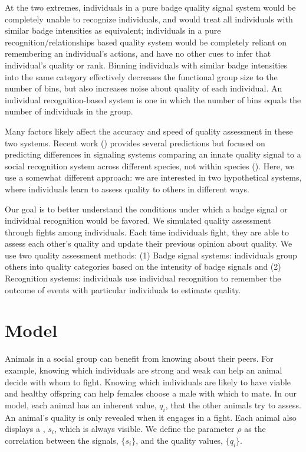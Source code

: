 At the two extremes, individuals in a pure badge quality signal system would be completely unable to recognize individuals, and would treat all individuals with similar badge intensities as equivalent; individuals in a pure recognition/relationships based quality system would be completely reliant on remembering an individual's actions, and have no other cues to infer that individual's quality or rank. Binning individuals with similar badge intensities into the same category effectively decreases the functional group size to the number of bins, but also increases noise about quality of each individual. An individual recognition-based system is one in which the number of bins equals the number of individuals in the group.  

Many factors likely affect the accuracy and speed of quality assessment in these two systems. Recent work (\cite{sheehan2016evotradeoff}) provides several predictions but focused on predicting differences in signaling systems comparing an innate quality signal to a social recognition system across different species, not within species (\cite{sheehan2016response}). Here, we use a somewhat different approach: we are interested in two hypothetical systems, where individuals learn to assess quality to others in different ways. 

Our goal is to better understand the conditions under which a badge signal or individual recognition would be favored. We simulated quality assessment through fights among individuals. Each time individuals fight, they are able to assess each other's quality and update their previous opinion about quality. We use two quality assessment methods: (1) Badge signal systems: individuals group others into quality categories based on the intensity of badge signals and (2) Recognition systems: individuals use individual recognition to remember the outcome of events with particular individuals to estimate quality. 

\section*{Model} 

Animals in a social group can benefit from knowing about their peers. For example, knowing which individuals are strong and weak can help an animal decide with whom to fight. Knowing which individuals are likely to have viable and healthy offspring can help females choose a male with which to mate. In our model, each animal has an inherent  value, $q_i$, that the other animals try to assess. An animal's quality is only revealed when it engages in a fight. Each animal also displays a , $s_i$, which is always visible. We define the parameter $\rho$ as the correlation between the signals, $\{s_i\}$, and the quality values, $\{q_i\}$.
  
